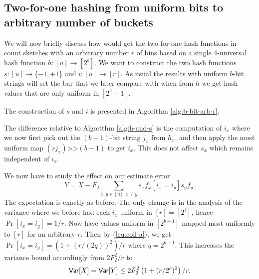 \documentclass[12pt]{article}
\newcommand{\Var}{{\sf Var}}
\newcommand{\req}[1]{(\ref{#1})}
\newcommand\fct\rightarrow
\begin{document}
\subsection{Two-for-one hashing from uniform bits to arbitrary number of buckets}
We will now briefly discuss how would get the two-for-one hash
functions in count sketches with an arbitrary number $r$ of bins based
on a single $4$-universal hash function $h:[u]\fct [2^b]$.  We want to
construct the two hash functions $s:[u]\fct\{-1,+1\}$ and
$i:[u]\fct[r]$. As usual the results with uniform $b$-bit strings will
set the bar that we later compare with when from $h$ we get hash values that
are only uniform in $[2^b-1]$.

The construction of $s$ and $i$ is presented in 
Algorithm \ref{alg:b-bit-arb-r}.
The difference relative to Algorithm \ref{alg:h-and-s} is the computation
of $i_x$ where we now first pick out the $(b-1)$-bit string $j_x$ from
$h_x$, and then apply the most uniform map $(rj_x)\texttt{>>}(b-1)$
to get $i_x$. This does not affect $s_x$ which remains independent
of $i_x$. 

We now have to study the effect on our estimate error
\[Y=X-F_2\sum_{x,y\in[u],x\neq y} s_x f_x[i_x=i_y]s_y f_y.\]
The expectation is exactly as before. The only
change is in the analysis of the variance where
we before had each $i_x$ uniform in $[r]=[2^\ell]$, hence
$\Pr[i_x=i_y]=1/r$. Now have values uniform in $[2^{b-1}]$ mapped
most uniformly to $[r]$ for an arbitrary $r$. Then by \req{eq:coll-a},
we get $\Pr[i_x=i_y]=\left(1+(r/(2q))^2\right)/r$ where $q=2^{b-1}$. 
This increases
the variance bound accordingly from $2F_2^2/r$ to
\begin{equation}\label{eq:Var-b-bit-arb-r}
\Var[X]=\Var[Y]\leq 2F_2^2\left(1+(r/2^b)^2\right)/r.
\end{equation}
\end{document}
